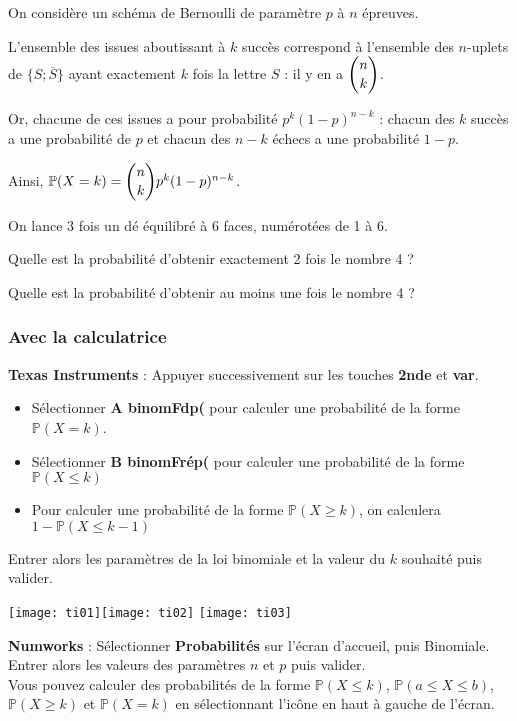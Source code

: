 \documentclass[11pt,fleqn, openany]{book} %
\begin{document}
\begin{demonstration}On considère un schéma de Bernoulli de paramètre $p$ à $n$ épreuves. 

L'ensemble des issues aboutissant à $k$ succès correspond à l'ensemble des $n$-uplets de $\{ S ; \overline{S} \}$ ayant exactement $k$ fois la lettre $S$ : il y en a $\dbinom{n}{k}$. 

Or, chacune de ces issues a pour probabilité $p^k(1-p)^{n-k}$ : chacun des $k$ succès a une probabilité de $p$ et chacun des $n-k$ échecs a une probabilité $1-p$. 

Ainsi, $\mathbb{P}(X=k)=\dbinom{n}{k}p^k(1-p)^{n-k}$.\end{demonstration}


\begin{example} On lance 3 fois un dé équilibré à 6 faces, numérotées de 1 à 6.

Quelle est la probabilité d'obtenir exactement 2 fois le nombre 4 ? 

\vskip100pt


Quelle est la probabilité d'obtenir au moins une fois le nombre 4 ? 

\vskip150pt

\end{example}

\subsubsection{Avec la calculatrice}

\textbf{Texas Instruments} : Appuyer successivement sur les touches \textbf{2nde} et \textbf{var}.
\begin{itemize}
\item Sélectionner \textbf{A binomFdp(} pour calculer une probabilité de la forme $\mathbb{P}(X=k)$.
\item Sélectionner\textbf{ B binomFrép(} pour calculer une probabilité de la forme $\mathbb{P}(X\leqslant k)$
\item Pour calculer une probabilité de la forme $\mathbb{P}(X \geqslant k)$, on calculera $1-\mathbb{P}(X \leqslant k-1)$
\end{itemize}
Entrer alors les paramètres de la loi binomiale et la valeur du $k$ souhaité puis valider.

\texttt{[image: ti01]}\hfill \texttt{[image: ti02]} \hfill \texttt{[image: ti03]}

\textbf{Numworks} : Sélectionner \textbf{Probabilités} sur l'écran d'accueil, puis Binomiale. Entrer alors les valeurs des paramètres $n$ et $p$ puis valider.\\
Vous pouvez calculer des probabilités de la forme $\mathbb{P}(X\leqslant k)$, $\mathbb{P}(a\leqslant X \leqslant b)$, $\mathbb{P}(X \geqslant k)$ et $\mathbb{P}(X=k)$ en sélectionnant l'icône en haut à gauche de l'écran.
\end{document}
